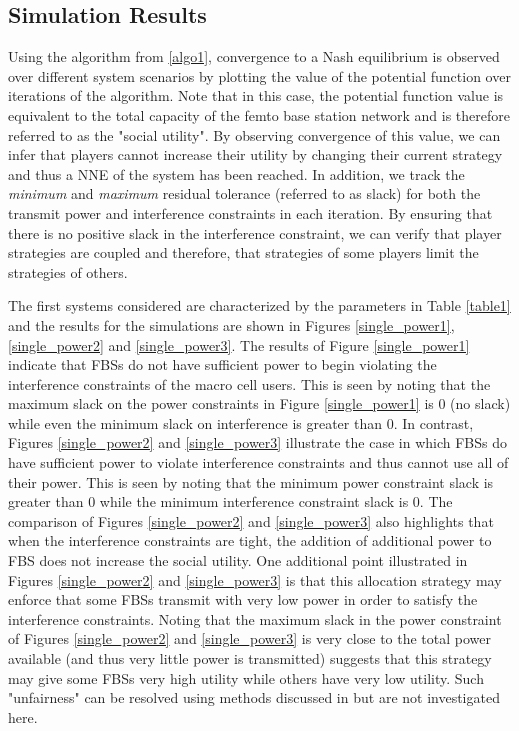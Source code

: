 \subsection{Simulation Results}
Using the algorithm from \ref{algo1}, convergence to a Nash equilibrium is observed over different system scenarios by plotting the value of the potential function over iterations of the algorithm. Note that in this case, the potential function value is equivalent to the total capacity of the femto base station network and is therefore referred to as the "social utility". By observing convergence of this value, we can infer that players cannot increase their utility by changing their current strategy and thus a NNE of the system has been reached.  In addition, we track the \emph{minimum} and \emph{maximum} residual tolerance (referred to as slack) for both the transmit power and interference constraints in each iteration. By ensuring that there is no positive slack in the interference constraint, we can verify that player strategies are coupled and therefore, that strategies of some players limit the strategies of others. 
\par
The first systems considered are characterized by the parameters in Table \ref{table1} and the results for the simulations are shown in Figures \ref{single_power1}, \ref{single_power2} and \ref{single_power3}. The results of Figure \ref{single_power1} indicate that FBSs do not have sufficient power to begin violating the interference constraints of the macro cell users. This is seen by noting that the maximum slack on the power constraints in Figure \ref{single_power1} is $0$ (no slack) while even the minimum slack on interference is greater than $0$. In contrast, Figures \ref{single_power2} and \ref{single_power3} illustrate the case in which FBSs do have sufficient power to violate interference constraints and thus cannot use all of their power. This is seen by noting that the minimum power constraint slack is greater than 0 while the minimum interference constraint slack is $0$. The comparison of Figures \ref{single_power2} and \ref{single_power3} also highlights that when the interference constraints are tight, the addition of additional power to FBS does not increase the social utility. One additional point illustrated in Figures \ref{single_power2} and \ref{single_power3} is that this allocation strategy may enforce that some FBSs transmit with very low power in order to satisfy the interference constraints. Noting that the maximum slack in the power constraint of Figures \ref{single_power2} and \ref{single_power3} is very close to the total power available (and thus very little power is transmitted) suggests that this strategy may give some FBSs very high utility while others have very low utility. Such "unfairness" can be resolved using methods discussed in \cite{kelly1998rate} but are not investigated here.



